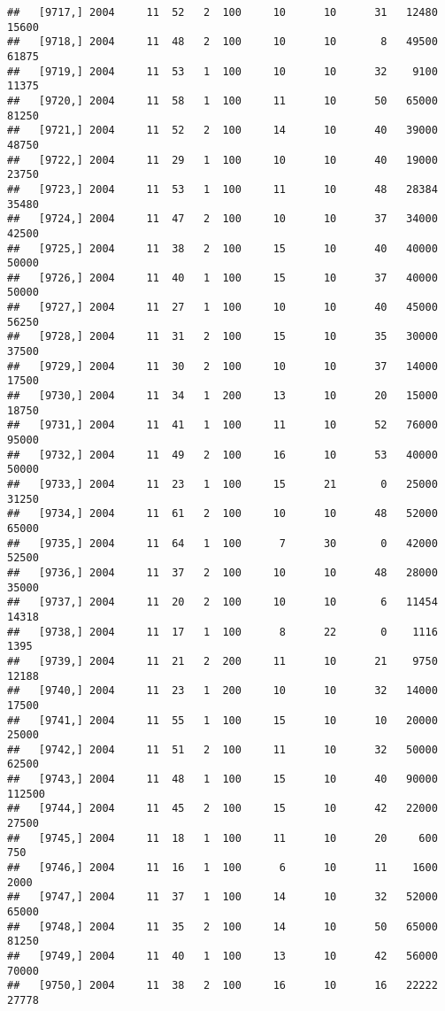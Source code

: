 \documentclass{article}\usepackage[]{graphicx}\usepackage[]{color}
\makeatletter
\newenvironment{kframe}{%
 \def\at@end@of@kframe{}%
 \ifinner\ifhmode%
  \def\at@end@of@kframe{\end{minipage}}%
  \begin{minipage}{\columnwidth}%
 \fi\fi%
 \def\FrameCommand##1{\hskip\@totalleftmargin \hskip-\fboxsep
 \colorbox{shadecolor}{##1}\hskip-\fboxsep
     \hskip-\linewidth \hskip-\@totalleftmargin \hskip\columnwidth}%
 \MakeFramed {\advance\hsize-\width
   \@totalleftmargin\z@ \linewidth\hsize
   \@setminipage}}%
 {\par\unskip\endMakeFramed%
 \at@end@of@kframe}
\newenvironment{knitrout}{}{} %
\makeatother
\begin{document}
\begin{knitrout}
\begin{kframe}
\begin{verbatim}
##   [9717,] 2004     11  52   2  100     10      10      31   12480   15600
##   [9718,] 2004     11  48   2  100     10      10       8   49500   61875
##   [9719,] 2004     11  53   1  100     10      10      32    9100   11375
##   [9720,] 2004     11  58   1  100     11      10      50   65000   81250
##   [9721,] 2004     11  52   2  100     14      10      40   39000   48750
##   [9722,] 2004     11  29   1  100     10      10      40   19000   23750
##   [9723,] 2004     11  53   1  100     11      10      48   28384   35480
##   [9724,] 2004     11  47   2  100     10      10      37   34000   42500
##   [9725,] 2004     11  38   2  100     15      10      40   40000   50000
##   [9726,] 2004     11  40   1  100     15      10      37   40000   50000
##   [9727,] 2004     11  27   1  100     10      10      40   45000   56250
##   [9728,] 2004     11  31   2  100     15      10      35   30000   37500
##   [9729,] 2004     11  30   2  100     10      10      37   14000   17500
##   [9730,] 2004     11  34   1  200     13      10      20   15000   18750
##   [9731,] 2004     11  41   1  100     11      10      52   76000   95000
##   [9732,] 2004     11  49   2  100     16      10      53   40000   50000
##   [9733,] 2004     11  23   1  100     15      21       0   25000   31250
##   [9734,] 2004     11  61   2  100     10      10      48   52000   65000
##   [9735,] 2004     11  64   1  100      7      30       0   42000   52500
##   [9736,] 2004     11  37   2  100     10      10      48   28000   35000
##   [9737,] 2004     11  20   2  100     10      10       6   11454   14318
##   [9738,] 2004     11  17   1  100      8      22       0    1116    1395
##   [9739,] 2004     11  21   2  200     11      10      21    9750   12188
##   [9740,] 2004     11  23   1  200     10      10      32   14000   17500
##   [9741,] 2004     11  55   1  100     15      10      10   20000   25000
##   [9742,] 2004     11  51   2  100     11      10      32   50000   62500
##   [9743,] 2004     11  48   1  100     15      10      40   90000  112500
##   [9744,] 2004     11  45   2  100     15      10      42   22000   27500
##   [9745,] 2004     11  18   1  100     11      10      20     600     750
##   [9746,] 2004     11  16   1  100      6      10      11    1600    2000
##   [9747,] 2004     11  37   1  100     14      10      32   52000   65000
##   [9748,] 2004     11  35   2  100     14      10      50   65000   81250
##   [9749,] 2004     11  40   1  100     13      10      42   56000   70000
##   [9750,] 2004     11  38   2  100     16      10      16   22222   27778

\end{verbatim}
\end{kframe}
\end{knitrout}
\end{document}
